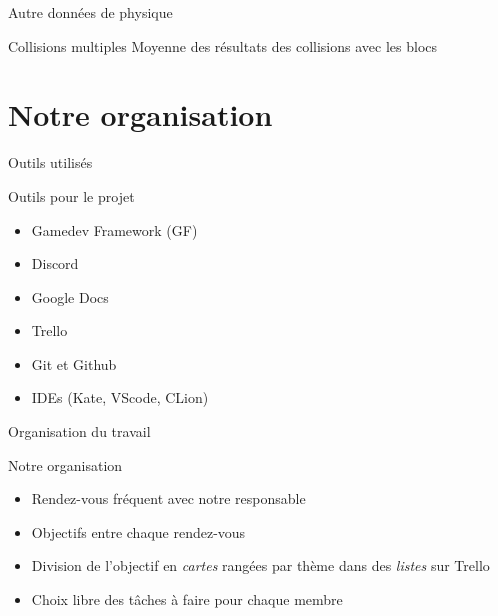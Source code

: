 \documentclass{beamer}
\begin{document}
{\begin{frame}{Autre données de physique}
    \begin{block}{Collisions multiples}
        Moyenne des résultats des collisions avec les blocs
    \end{block}
\end{frame}

\section{Notre organisation}

\begin{frame}{Outils utilisés}
    \begin{block}{Outils pour le projet}
        \begin{itemize}
            \item[\bullet] Gamedev Framework (GF)
            \item[\bullet] Discord
            \item[\bullet] Google Docs
            \item[\bullet] Trello
            \item[\bullet] Git et Github
            \item[\bullet] IDEs (Kate, VScode, CLion)
        \end{itemize}
    \end{block}
\end{frame}

\begin{frame}{Organisation du travail}
    \begin{block}{Notre organisation}
        \begin{itemize}
            \item[\bullet] Rendez-vous fréquent avec notre responsable
            \item[\bullet] Objectifs entre chaque rendez-vous
            \item[\bullet] Division de l'objectif en \emph{cartes} rangées par thème dans des \emph{listes} sur Trello
            \item[\bullet] Choix libre des tâches à faire pour chaque membre
        \end{itemize}
    \end{block}
\end{frame}

}
\end{document}
